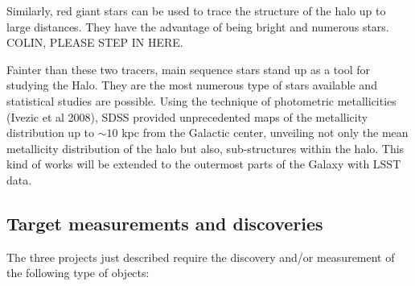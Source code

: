 Similarly, red giant stars can be used to trace the structure of the halo up to large
distances. They have the advantage 
of being bright and numerous stars. COLIN, PLEASE STEP IN HERE.

Fainter than these two tracers, main sequence stars stand up as a tool for studying
the Halo. They are the most numerous type of stars available and statistical studies 
are possible. Using the technique of photometric metallicities (Ivezic et al 2008), 
SDSS provided unprecedented maps of the metallicity distribution up to  $\sim 10$ 
kpc from the Galactic center, unveiling not only the mean metallicity distribution 
of the halo but also, sub-structures within the halo. This kind of works will be extended
to the outermost parts of the Galaxy with LSST data.



\subsection{Target measurements and discoveries}
\label{sec:keyword:MW_Halo_targets}

The three projects just described require the discovery and/or measurement of the following 
type of objects:

